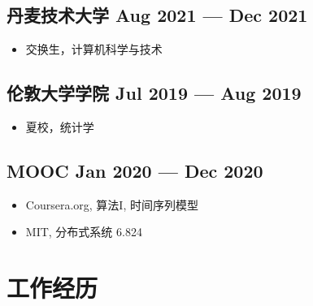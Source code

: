 \documentclass[a4,12pt]{article}
\newcommand{\subtext}[1]{
#1\par\vspace{-0.3cm}}
\newenvironment{zitemize}{
\begin{itemize}\itemsep0pt \parskip0pt \parsep1pt}
{\end{itemize}\vspace{-0.5cm}}
\begin{document}
\subsection*{丹麦技术大学 \hfill \textbf{Aug 2021 --- Dec 2021}}
\begin{zitemize}
    \item
        \subtext{交换生，计算机科学与技术}
        \vspace{0.15cm}
\end{zitemize}

\subsection*{伦敦大学学院 \hfill \textbf{Jul 2019 --- Aug 2019}}
\begin{zitemize}
    \item
        \subtext{夏校，统计学}
        \vspace{0.15cm}
\end{zitemize}

\subsection*{MOOC \hfill \textbf{Jan 2020 --- Dec 2020}}
\begin{zitemize}
    \item
        \subtext{Coursera.org, 算法I, 时间序列模型 }
        \vspace{0.15cm}
    \item
        \subtext{MIT, 分布式系统 6.824}
        \vspace{0.15cm}
\end{zitemize}
\vspace{0.2cm}





\section{\textbf{工作经历}}

        
\end{document}
